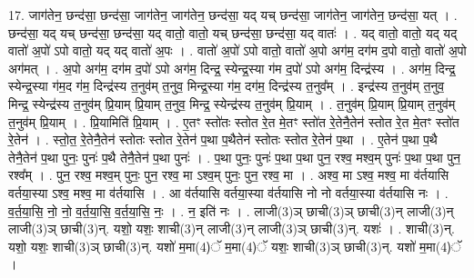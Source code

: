 \documentclass[17pt]{extarticle}
\begin{document}
17. जाग॑तेन॒ छन्द॑सा॒ छन्द॑सा॒ जाग॑तेन॒ जाग॑तेन॒ छन्द॑सा॒ यद् यच् छन्द॑सा॒ जाग॑तेन॒ जाग॑तेन॒ छन्द॑सा॒ यत् । . छन्द॑सा॒ यद् यच् छन्द॑सा॒ छन्द॑सा॒ यद् वातो॒ वातो॒ यच् छन्द॑सा॒ छन्द॑सा॒ यद् वातः॑ । . यद् वातो॒ वातो॒ यद् यद् वातो॑ अ॒पो॑ ऽपो वातो॒ यद् यद् वातो॑ अ॒पः । . वातो॑ अ॒पो॑ ऽपो वातो॒ वातो॑ अ॒पो अग॑म॒ दग॑म द॒पो वातो॒ वातो॑ अ॒पो अग॑मत् । . अ॒पो अग॑म॒ दग॑म द॒पो॑ ऽपो अग॑म॒ दिन्द्र॒ स्येन्द्र॒स्या ग॑म द॒पो॑ ऽपो अग॑म॒ दिन्द्र॑स्य । . अग॑म॒ दिन्द्र॒ स्येन्द्र॒स्या ग॑म॒द ग॑म॒ दिन्द्र॑स्य त॒नुव॑म् त॒नुव॒ मिन्द्र॒स्या ग॑म॒ दग॑म॒ दिन्द्र॑स्य त॒नुव᳚म् । . इन्द्र॑स्य त॒नुव॑म् त॒नुव॒ मिन्द्र॒ स्येन्द्र॑स्य त॒नुव॑म् प्रि॒याम् प्रि॒याम् त॒नुव॒ मिन्द्र॒ स्येन्द्र॑स्य त॒नुव॑म् प्रि॒याम् । . त॒नुव॑म् प्रि॒याम् प्रि॒याम् त॒नुव॑म् त॒नुव॑म् प्रि॒याम् । . प्रि॒यामिति॑ प्रि॒याम् । . ए॒तꣳ स्तो॑तः स्तोत रे॒त मे॒तꣳ स्तो॑त रे॒तेनै॒तेन॑ स्तोत रे॒त मे॒तꣳ स्तो॑त रे॒तेन॑ । . स्तो॒त॒ रे॒तेनै॒तेन॑ स्तोतः स्तोत रे॒तेन॑ प॒था प॒थैतेन॑ स्तोतः स्तोत रे॒तेन॑ प॒था । . ए॒तेन॑ प॒था प॒थै तेनै॒तेन॑ प॒था पुनः॒ पुनः॑ प॒थै तेनै॒तेन॑ प॒था पुनः॑ । . प॒था पुनः॒ पुनः॑ प॒था प॒था पुन॒ रश्व॒ मश्व॒म् पुनः॑ प॒था प॒था पुन॒ रश्व᳚म् । . पुन॒ रश्व॒ मश्व॒म् पुनः॒ पुन॒ रश्व॒ मा ऽश्व॒म् पुनः॒ पुन॒ रश्व॒ मा । . अश्व॒ मा ऽश्व॒ मश्व॒ मा व॑र्तयासि वर्तया॒स्या ऽश्व॒ मश्व॒ मा व॑र्तयासि । . आ व॑र्तयासि वर्तया॒स्या व॑र्तयासि नो नो वर्तया॒स्या व॑र्तयासि नः । . व॒र्त॒या॒सि॒ नो॒ नो॒ व॒र्त॒या॒सि॒ व॒र्त॒या॒सि॒ नः॒ । . न॒ इति॑ नः । . लाजी(3)ञ् छाची(3)ञ् छाची(3)न् लाजी(3)न् लाजी(3)ञ् छाची(3)न्. यशो॒ यशः॒ शाची(3)न् लाजी(3)न् लाजी(3)ञ् छाची(3)न्. यशः॑ । . शाची(3)न्. यशो॒ यशः॒ शाची(3)ञ् छाची(3)न्. यशो॑ म॒मा(4)ॅ म॒मा(4)ॅ यशः॒ शाची(3)ञ् छाची(3)न्. यशो॑ म॒मा(4)ॅ । \newline
\end{document}
